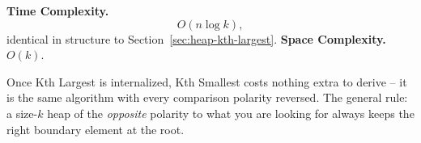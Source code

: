 \begin{complexitybox}
\textbf{Time Complexity.}
\[
  O(n \log k),
\]
identical in structure to Section~\ref{sec:heap-kth-largest}.
\textbf{Space Complexity.} $O(k)$.
\end{complexitybox}

\begin{takeawaybox}
Once Kth Largest is internalized, Kth Smallest costs nothing extra to
derive -- it is the same algorithm with every comparison polarity
reversed. The general rule: a size-$k$ heap of the \emph{opposite}
polarity to what you are looking for always keeps the right boundary
element at the root.
\end{takeawaybox}
